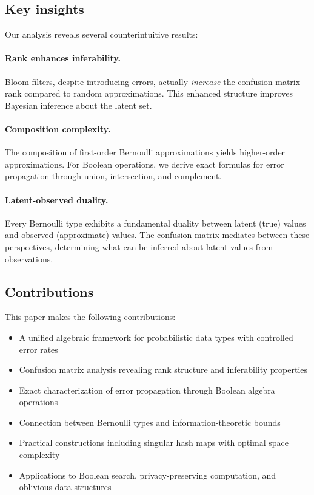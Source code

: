 \documentclass[11pt,final,hidelinks]{article}
\theoremstyle{plain}
\begin{document}
\subsection{Key insights}

Our analysis reveals several counterintuitive results:

\paragraph{Rank enhances inferability.} Bloom filters, despite introducing errors, actually \emph{increase} the confusion matrix rank compared to random approximations. This enhanced structure improves Bayesian inference about the latent set.

\paragraph{Composition complexity.} The composition of first-order Bernoulli approximations yields higher-order approximations. For Boolean operations, we derive exact formulas for error propagation through union, intersection, and complement.

\paragraph{Latent-observed duality.} Every Bernoulli type exhibits a fundamental duality between latent (true) values and observed (approximate) values. The confusion matrix mediates between these perspectives, determining what can be inferred about latent values from observations.

\subsection{Contributions}

This paper makes the following contributions:

\begin{itemize}
\item A unified algebraic framework for probabilistic data types with controlled error rates
\item Confusion matrix analysis revealing rank structure and inferability properties
\item Exact characterization of error propagation through Boolean algebra operations
\item Connection between Bernoulli types and information-theoretic bounds
\item Practical constructions including singular hash maps with optimal space complexity
\item Applications to Boolean search, privacy-preserving computation, and oblivious data structures
\end{itemize}
\end{document}
